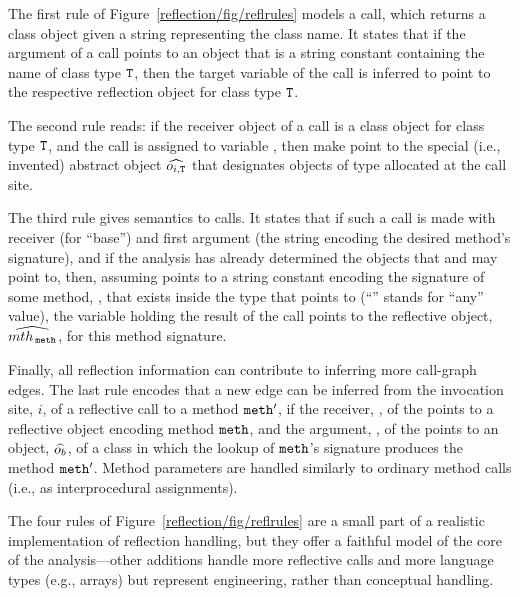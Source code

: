 The first rule of Figure~\ref{reflection/fig/reflrules} models a
 call, which returns a class object given a string
representing the class name. It states that if the argument of a
 call points to an object that is a string constant
containing the name of class type \(\texttt{T}\), then the target variable
of the  call is inferred to point to the respective
reflection object for class type \(\texttt{T}\).

The second rule reads: if the receiver object of a 
call is a class object for class type \(\texttt{T}\), and the
 call is assigned to variable , then make
 point to the special (i.e., invented) abstract object
\(\widehat{o_{i,\texttt{T}}}\) that designates objects of type 
allocated at the  call site.

The third rule gives semantics to  calls.  It states
that if such a call is made with receiver  (for ``base'') and
first argument  (the string encoding the desired method's
signature), and if the analysis has already determined the objects
that  and  may point to, then, assuming  points
to a string constant encoding the signature of some method,
, that exists inside the type that  points to
(``\var{\_}'' stands for ``any'' value), the variable  holding
the result of the  call points to the reflective
object, \(\widehat{mth_{\,\texttt{meth}}}\), for this method signature.

Finally, all reflection information can contribute to inferring more
call-graph edges. The last rule encodes that a new edge can be
inferred from the invocation site, \(i\), of a reflective
 call to a method \(\texttt{meth}'\), if the receiver,
, of the  points to a reflective object encoding
method \(\texttt{meth}\), and the argument, , of the
 points to an object, \(\widehat{o_b}\), of a class in
which the lookup of \(\texttt{meth}\)'s signature produces the method
\(\texttt{meth}'\). Method parameters are handled similarly to ordinary
method calls (i.e., as interprocedural assignments).

The four rules of Figure~\ref{reflection/fig/reflrules} are a small
part of a realistic implementation of reflection handling, but they
offer a faithful model of the core of the analysis---other additions
handle more reflective calls and more language types (e.g., arrays)
but represent engineering, rather than conceptual handling.

